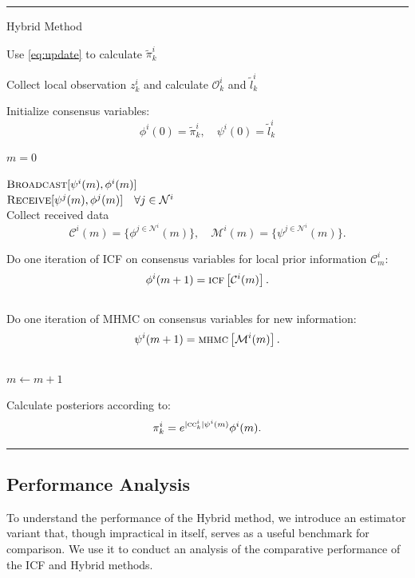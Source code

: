 \documentclass[journal]{IEEEtran}
\theoremstyle{remark}
\newcommand{\yy}[3][2]{\psi^{  #3}({  #2})}
\newcommand{\YY}[3][2]{\phi^{  #3}({  #2})}
\theoremstyle{definition}
\begin{document}
\begin{algorithm}[!ht]
\hrule
\caption{Hybrid Method}
\label{alg:inf-predict}
Use \eqref{eq:update} to calculate  $\tilde{\pi}^i_{k}$\label{alg:localpred}

Collect local observation ${z}^i_{k}$ and calculate ${\mathcal{O}}^i_{k}$ 
and $\tilde{l}_k^i$\label{alg:localobs}

Initialize consensus variables:
\begin{equation*}
\YY[]{0}{i} = \tilde{\pi}^i_{k}, \quad \yy[]{0}{i} = \tilde{l}_k^i
\end{equation*}

$m=0$\\
{ $\textsc{Broadcast}[ \yy[]{m}{i}, \YY[]{m}{i}]$\\
$\textsc{Receive}[ \yy[]{m}{j}, \YY[]{m}{j} ] \quad \forall j \in 
\mathcal{N}^i$\\ 
Collect received data 
\begin{equation*}
\mathcal{C}^i(m)=\{  \YY[]{m}{j \in  \mathcal{N}^i} \}, \quad  
\mathcal{M}^i(m)=\{  \yy[]{m}{j \in  \mathcal{N}^i} \}.
\end{equation*}

Do one iteration of ICF on consensus variables for local prior 
information $\mathcal{C}^i_m$:
$$ \YY[]{m+1}{i}=\textsc{icf}\left[\mathcal{C}^i(m)\right].$$\\
Do one iteration of MHMC on consensus variables for new 
information:   $$ \yy[]{m+1}{i}=\textsc{mhmc}\left[\mathcal{M}^i(m)\right].$$\\
$m\leftarrow m+1$\\
}
Calculate posteriors according to:\label{alg:posterior}
\begin{equation*}\textbf{}
{\pi}^i_{k} = e^{|\textsc{cc}^i_k|\yy[]{m}{i}}\YY[]{m}{i}.
\end{equation*}
\hrule\vspace*{4pt}
\end{algorithm}

\subsection{Performance Analysis}
\label{subsec:hyb_analysis}

To understand the performance of the Hybrid method, we introduce an estimator
variant that, though impractical in itself,
serves as a useful benchmark for comparison. We use it to conduct an analysis
of the comparative performance of the ICF and Hybrid methods. 
\end{document}

